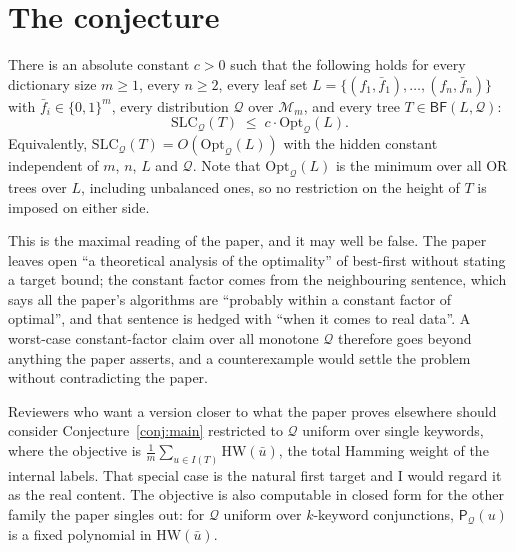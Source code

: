 \documentclass{aicr-conjecture}
\newcommand{\bits}{\{0,1\}}
\newcommand{\Qd}{\mathcal{Q}}
\newcommand{\Mon}{\mathcal{M}}
\newcommand{\Pcost}{\mathsf{P}}
\newcommand{\SLC}{\mathrm{SLC}}
\newcommand{\Opt}{\mathrm{Opt}}
\newcommand{\BF}{\mathsf{BF}}
\newcommand{\HW}{\mathrm{HW}}
\begin{document}
\section{The conjecture}\label{sec:conjectures}

\begin{conjecture}\label{conj:main}
There is an absolute constant $c > 0$ such that the following holds for
every dictionary size $m \ge 1$, every $n \ge 2$, every leaf set
$L = \{(f_1,\bar f_1),\dots,(f_n,\bar f_n)\}$ with
$\bar f_i \in \bits^m$, every distribution $\Qd$ over $\Mon_m$, and every
tree $T \in \BF(L,\Qd)$:
\[
  \SLC_{\Qd}(T) \;\le\; c \cdot \Opt_{\Qd}(L).
\]
Equivalently, $\SLC_{\Qd}(T) = O(\Opt_{\Qd}(L))$ with the hidden constant
independent of $m$, $n$, $L$ and $\Qd$. Note that $\Opt_{\Qd}(L)$ is the
minimum over all OR trees over $L$, including unbalanced ones, so no
restriction on the height of $T$ is imposed on either side.
\end{conjecture}

\begin{remark}\label{rem:strength}
This is the maximal reading of the paper, and it may well be false. The
paper leaves open ``a theoretical analysis of the optimality'' of
best-first without stating a target bound; the constant factor comes from
the neighbouring sentence, which says all the paper's algorithms are
``probably within a constant factor of optimal'', and that sentence is
hedged with ``when it comes to real data''. A worst-case constant-factor
claim over all monotone $\Qd$ therefore goes beyond anything the paper
asserts, and a counterexample would settle the problem without
contradicting the paper.
\end{remark}

\begin{remark}\label{rem:single}
Reviewers who want a version closer to what the paper proves elsewhere
should consider Conjecture~\ref{conj:main} restricted to $\Qd$ uniform
over single keywords, where the objective is
$\frac{1}{m}\sum_{u \in I(T)} \HW(\bar u)$, the total Hamming weight of
the internal labels. That special case is the natural first target and I
would regard it as the real content. The objective is also computable in
closed form for the other family the paper singles out: for $\Qd$ uniform
over $k$-keyword conjunctions, $\Pcost_{\Qd}(u)$ is a fixed polynomial in
$\HW(\bar u)$.
\end{remark}
\end{document}
